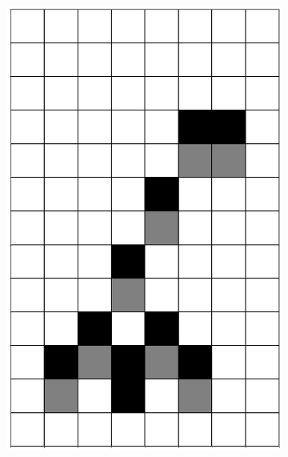 \documentclass[12pt]{article}
\numberwithin{figure}{section} %
\begin{document}
\begin{figure}[H]
   \setcounter{subfigure}{0}
         \begin{subfigure}{0.3\textwidth}
     \centering
     \includegraphics[angle=270,width=\linewidth]{Section4/13.0}
     \subcaption{}
   \end{subfigure}
     \begin{subfigure}{0.3\textwidth}
     \centering

\end{subfigure}
\end{figure}
\end{document}
